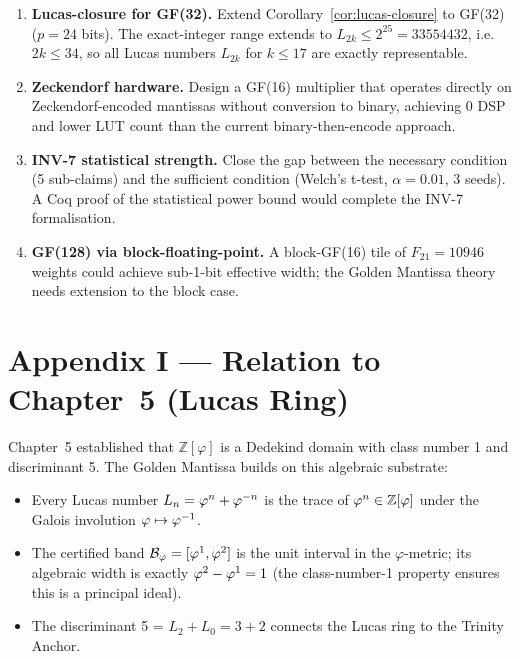 \begin{enumerate}
  \item \textbf{Lucas-closure for GF(32).}  Extend
    Corollary~\ref{cor:lucas-closure} to GF(32) (\(p = 24\) bits).
    The exact-integer range extends to \(L_{2k} \leq 2^{25} =
    33554432\), i.e.\ \(2k \leq 34\), so all Lucas numbers
    \(L_{2k}\) for \(k \leq 17\) are exactly representable.
  \item \textbf{Zeckendorf hardware.}  Design a GF(16) multiplier
    that operates directly on Zeckendorf-encoded mantissas without
    conversion to binary, achieving 0 DSP and lower LUT count than
    the current binary-then-encode approach.
  \item \textbf{INV-7 statistical strength.}  Close the gap between
    the necessary condition (5 sub-claims) and the sufficient
    condition (Welch's t-test, \(\alpha = 0.01\), 3 seeds).
    A Coq proof of the statistical power bound would complete
    the INV-7 formalisation.
  \item \textbf{GF(128) via block-floating-point.}  A block-GF(16)
    tile of \(F_{21} = 10946\) weights could achieve sub-1-bit
    effective width; the Golden Mantissa theory needs extension to
    the block case.
\end{enumerate}

\section{Appendix I — Relation to Chapter~5 (Lucas Ring)}
\label{sec:appendix-i}

Chapter~5 established that \(\mathbb{Z}[\varphi]\) is a Dedekind
domain with class number 1 and discriminant 5.  The Golden Mantissa
builds on this algebraic substrate:

\begin{itemize}
  \item Every Lucas number \(L_n = \varphi^{n} + \varphi^{-n}\) is the
    trace of \(\varphi^{n} \in \mathbb{Z}[\varphi]\) under the Galois
    involution \(\varphi \mapsto \varphi^{-1}\).
  \item The certified band \(\mathcal{B}_\varphi = [\varphi^{1},
    \varphi^{2}]\) is the unit interval in the \(\varphi\)-metric;
    its algebraic width is exactly \(\varphi^{2} - \varphi^{1} = 1\)
    (the class-number-1 property ensures this is a principal ideal).
  \item The discriminant 5 = \(L_2 + L_0 = 3 + 2\) connects the
    Lucas ring to the Trinity Anchor.
\end{itemize}

